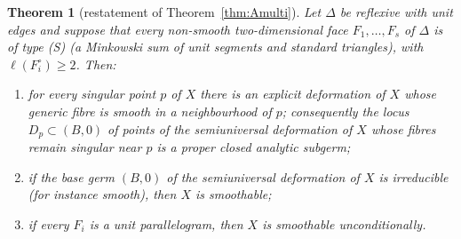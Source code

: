 \documentclass[11pt]{amsart}
\newtheorem{theorem}{Theorem}[section]
\theoremstyle{definition}
\theoremstyle{remark}
\begin{document}
\begin{theorem}[restatement of Theorem~\textup{\ref{thm:Amulti}}]\label{thm:A3}
Let $\Delta$ be reflexive with unit edges and suppose that every
non-smooth two-dimensional face $F_1,\dots,F_s$ of $\Delta$ is of type
\textup{(S)} (a Minkowski sum of unit segments and standard
triangles), with $\ell(F_i^\circ) \ge 2$.  Then:
\begin{enumerate}
\item for every singular point $p$ of $X$ there is an explicit
deformation of $X$ whose generic fibre is smooth in a neighbourhood of
$p$; consequently the locus $D_p \subset (B,0)$ of points of the
semiuniversal deformation of $X$ whose fibres remain singular near $p$
is a proper closed analytic subgerm;
\item if the base germ $(B,0)$ of the semiuniversal deformation of $X$
is irreducible (for instance smooth), then $X$ is smoothable;
\item if every $F_i$ is a unit parallelogram, then $X$ is smoothable
unconditionally.
\end{enumerate}
\end{theorem}
\end{document}

